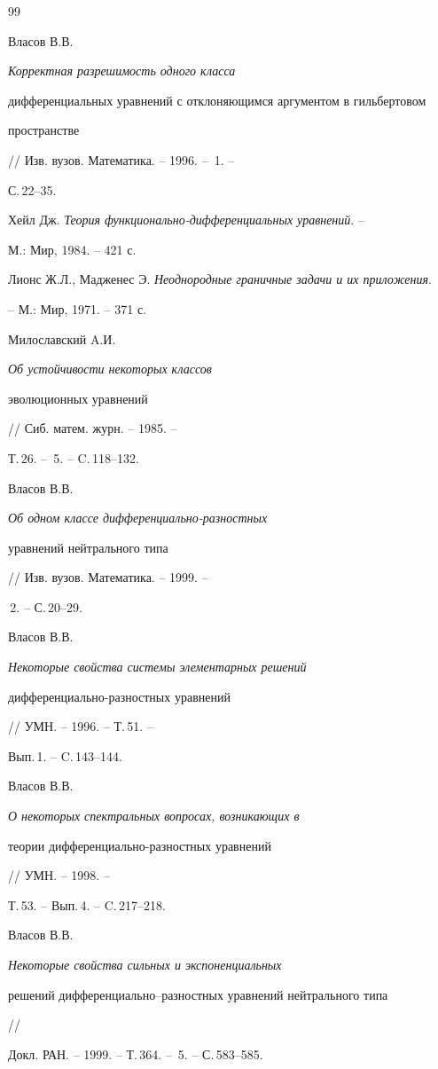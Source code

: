 \begin{thebibliography}{99}


Власов В.В. {\em Корректная разрешимость одного класса 


дифференциальных уравнений с отклоняющимся аргументом в гильбертовом 


пространстве} // Изв. вузов. Математика. -- 1996. -- \No\,1. -- 


С.\,22--35. 




Хейл Дж. {\em Теория функционально-дифференциальных уравнений}. -- 


М.: Мир, 1984. -- 421 с. 




Лионс Ж.Л., Мадженес Э. {\em Неоднородные граничные задачи и их приложения}.


-- М.: Мир, 1971. -- 371 с. 




Милославский A.И. {\em Об устойчивости некоторых классов 


эволюционных уравнений} // Сиб. матем. журн. -- 1985. -- 


Т.\,26. -- \No\,5. -- C.\,118--132. 




Власов В.В. {\em Об одном классе дифференциально-разностных 


уравнений нейтрального типа} // Изв. вузов. Математика. -- 1999. -- 


\No\,2. -- С.\,20--29. 




Власов В.В. {\em Некоторые свойства системы элементарных решений 


дифференциально-разностных уравнений} // УМН. -- 1996. -- Т.\,51. -- 


Вып.\,1. -- C.\,143--144. 




Власов В.В. {\em О некоторых спектральных вопросах, возникающих в 


теории дифференциально-разностных уравнений} // УМН. -- 1998. -- 


Т.\,53. -- Вып.\,4. -- C.\,217--218. 




Власов В.В. {\em Некоторые свойства сильных и экспоненциальных 


решений дифференциально--разностных уравнений нейтрального типа} // 


Докл. РАН. -- 1999. -- Т.\,364. -- \No\,5. -- С.\,583--585. 



\end{thebibliography}
